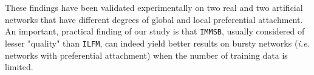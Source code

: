 \documentclass[french]{hermes-journal}
\newcommand{\ilfm}{\texttt{ILFM}}
\newcommand{\immsb}{\texttt{IMMSB}}
\begin{document}
These findings have been validated experimentally on two real and two artificial networks that have different degrees of global and local preferential attachment. An important, practical finding of our study is that \immsb, usually considered of lesser "quality" than \ilfm, can indeed yield better results on bursty networks (\textit{i.e.} networks with preferential attachment) when the number of training data is limited.
%
 

%

\end{document}
